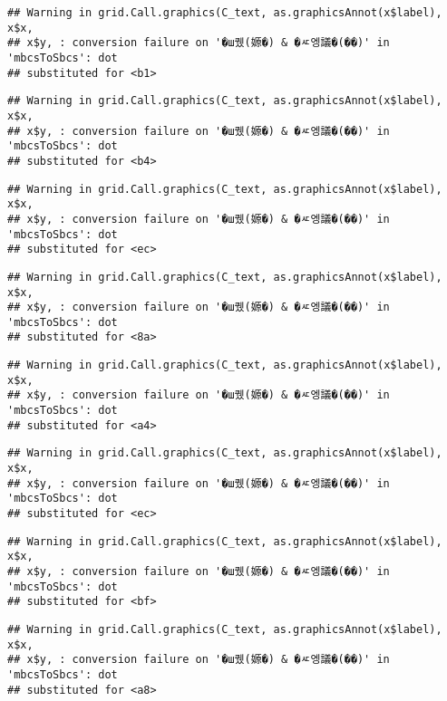 \documentclass[
]{article}
\begin{document}
\begin{verbatim}
## Warning in grid.Call.graphics(C_text, as.graphicsAnnot(x$label), x$x,
## x$y, : conversion failure on '�ш퀬(嫄�) & �ㅼ엥議�(��)' in 'mbcsToSbcs': dot
## substituted for <b1>
\end{verbatim}

\begin{verbatim}
## Warning in grid.Call.graphics(C_text, as.graphicsAnnot(x$label), x$x,
## x$y, : conversion failure on '�ш퀬(嫄�) & �ㅼ엥議�(��)' in 'mbcsToSbcs': dot
## substituted for <b4>
\end{verbatim}

\begin{verbatim}
## Warning in grid.Call.graphics(C_text, as.graphicsAnnot(x$label), x$x,
## x$y, : conversion failure on '�ш퀬(嫄�) & �ㅼ엥議�(��)' in 'mbcsToSbcs': dot
## substituted for <ec>
\end{verbatim}

\begin{verbatim}
## Warning in grid.Call.graphics(C_text, as.graphicsAnnot(x$label), x$x,
## x$y, : conversion failure on '�ш퀬(嫄�) & �ㅼ엥議�(��)' in 'mbcsToSbcs': dot
## substituted for <8a>
\end{verbatim}

\begin{verbatim}
## Warning in grid.Call.graphics(C_text, as.graphicsAnnot(x$label), x$x,
## x$y, : conversion failure on '�ш퀬(嫄�) & �ㅼ엥議�(��)' in 'mbcsToSbcs': dot
## substituted for <a4>
\end{verbatim}

\begin{verbatim}
## Warning in grid.Call.graphics(C_text, as.graphicsAnnot(x$label), x$x,
## x$y, : conversion failure on '�ш퀬(嫄�) & �ㅼ엥議�(��)' in 'mbcsToSbcs': dot
## substituted for <ec>
\end{verbatim}

\begin{verbatim}
## Warning in grid.Call.graphics(C_text, as.graphicsAnnot(x$label), x$x,
## x$y, : conversion failure on '�ш퀬(嫄�) & �ㅼ엥議�(��)' in 'mbcsToSbcs': dot
## substituted for <bf>
\end{verbatim}

\begin{verbatim}
## Warning in grid.Call.graphics(C_text, as.graphicsAnnot(x$label), x$x,
## x$y, : conversion failure on '�ш퀬(嫄�) & �ㅼ엥議�(��)' in 'mbcsToSbcs': dot
## substituted for <a8>
\end{verbatim}
\end{document}
